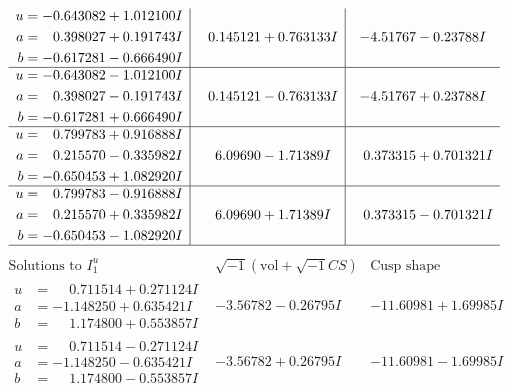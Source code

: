 \documentclass[1p]{elsarticle_modified}
\theoremstyle{definition}
\newcommand{\I}{\sqrt{-1}}
\begin{document}
$$\begin{array}{c|c|c}
\begin{aligned}
u &= -0.643082 + 1.012100 I \\
a &= \phantom{-}0.398027 + 0.191743 I \\
b &= -0.617281 - 0.666490 I\end{aligned}
 & \phantom{-}0.145121 + 0.763133 I & -4.51767 - 0.23788 I \\ \hline\begin{aligned}
u &= -0.643082 - 1.012100 I \\
a &= \phantom{-}0.398027 - 0.191743 I \\
b &= -0.617281 + 0.666490 I\end{aligned}
 & \phantom{-}0.145121 - 0.763133 I & -4.51767 + 0.23788 I \\ \hline\begin{aligned}
u &= \phantom{-}0.799783 + 0.916888 I \\
a &= \phantom{-}0.215570 - 0.335982 I \\
b &= -0.650453 + 1.082920 I\end{aligned}
 & \phantom{-}6.09690 - 1.71389 I & \phantom{-}0.373315 + 0.701321 I \\ \hline\begin{aligned}
u &= \phantom{-}0.799783 - 0.916888 I \\
a &= \phantom{-}0.215570 + 0.335982 I \\
b &= -0.650453 - 1.082920 I\end{aligned}
 & \phantom{-}6.09690 + 1.71389 I & \phantom{-}0.373315 - 0.701321 I\\
 \hline 
 \end{array}$$\newpage$$\begin{array}{c|c|c}  
\text{Solutions to }I^u_{1}& \I (\text{vol} + \sqrt{-1}CS) & \text{Cusp shape}\\
 \hline 
\begin{aligned}
u &= \phantom{-}0.711514 + 0.271124 I \\
a &= -1.148250 + 0.635421 I \\
b &= \phantom{-}1.174800 + 0.553857 I\end{aligned}
 & -3.56782 - 0.26795 I & -11.60981 + 1.69985 I \\ \hline\begin{aligned}
u &= \phantom{-}0.711514 - 0.271124 I \\
a &= -1.148250 - 0.635421 I \\
b &= \phantom{-}1.174800 - 0.553857 I\end{aligned}
 & -3.56782 + 0.26795 I & -11.60981 - 1.69985 I \\ \hline\begin{aligned}

\end{aligned}
\end{array}$$
\end{document}
